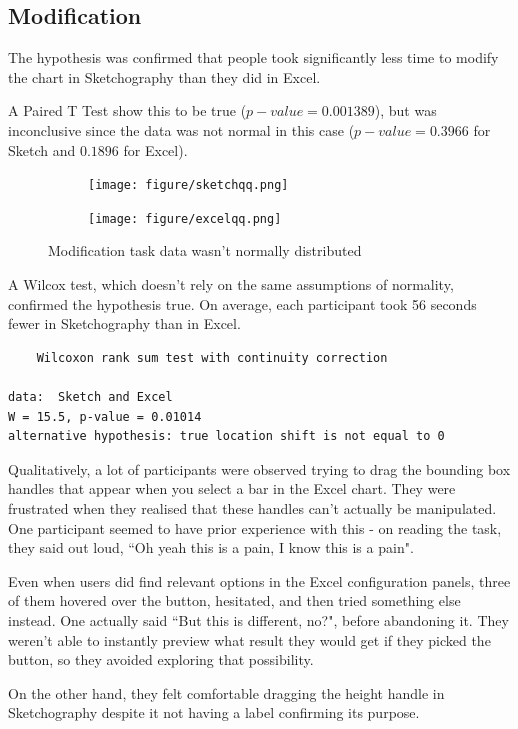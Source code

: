 \subsection{Modification}
The hypothesis was confirmed that people took significantly less time to modify the chart in Sketchography than they did in Excel.

A Paired T Test show this to be true ($p-value = 0.001389$), but was inconclusive since the data was not normal in this case ($p-value = 0.3966$ for Sketch and $0.1896$ for Excel). 

\begin{figure}[H]
		\centering
		\begin{subfigure}[b]{0.4\textwidth}
			\texttt{[image: figure/sketchqq.png]}
		\end{subfigure}
		\begin{subfigure}[b]{0.4\textwidth}
			\texttt{[image: figure/excelqq.png]}
		\end{subfigure}
		\caption{Modification task data wasn't normally distributed}
	\end{figure}

A Wilcox test, which doesn't rely on the same assumptions of normality, confirmed the hypothesis true. On average, each participant took 56 seconds fewer in Sketchography than in Excel.

\begin{verbatim}
	Wilcoxon rank sum test with continuity correction

data:  Sketch and Excel
W = 15.5, p-value = 0.01014
alternative hypothesis: true location shift is not equal to 0
\end{verbatim}

Qualitatively, a lot of participants were observed trying to drag the bounding box handles that appear when you select a bar in the Excel chart. They were frustrated when they realised that these handles can't actually be manipulated. One participant seemed to have prior experience with this - on reading the task, they said out loud, ``Oh yeah this is a pain, I know this is a pain".

Even when users did find relevant options in the Excel configuration panels, three of them hovered over the button, hesitated, and then tried something else instead. One actually said ``But this is different, no?", before abandoning it. They weren't able to instantly preview what result they would get if they picked the button, so they avoided exploring that possibility. 

On the other hand, they felt comfortable dragging the height handle in Sketchography despite it not having a label confirming its purpose.

